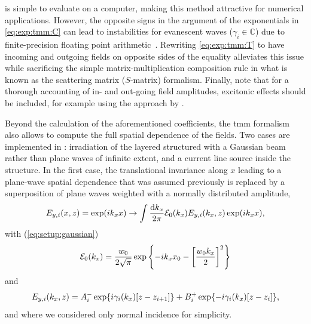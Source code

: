  is simple to evaluate on a computer, making this method attractive for numerical applications.
However, the opposite signs in the argument of the exponentials in \cref{eq:exp:tmm:C} can lead to instabilities for evanescent waves ($\gamma_i\in\mathbb{C}$) due to finite-precision floating point arithmetic~\cite{Duetz}.
Rewriting \cref{eq:exp:tmm:T} to have incoming and outgoing fields on opposite sides of the equality alleviates this issue while sacrificing the simple matrix-multiplication composition rule in what is known as the scattering matrix ($S$-matrix) formalism.
Finally, note that for a thorough accounting of in- and out-going field amplitudes, excitonic effects should be included, for example using the approach by \textcite{DAndrea1990}.

Beyond the calculation of the aforementioned coefficients, the \gls{tmm} formalism also allows to compute the full spatial dependence of the fields.
Two cases are implemented in \pymoosh: irradiation of the layered structured with a Gaussian beam rather than plane waves of infinite extent, and a current line source inside the structure.
In the first case, the translational invariance along $x$ leading to a plane-wave spatial dependence
that was assumed previously is replaced by a superposition of plane waves weighted with a normally distributed amplitude,
\begin{equation}\label{eq:exp:tmm:gauss:x}
    E_{y,i}(x,z) = \exp(i k_x x)\rightarrow \int\frac{\dd{k_x}}{2\pi}\mathcal{E}_0(k_x) E_{y,i}(k_x, z)\exp(i k_x x),
\end{equation}
with (\cf \cref{eq:setup:gaussian})
\begin{equation}\label{eq:exp:tmm:gauss:ampl}
    \mathcal{E}_0(k_x) = \frac{w_0}{2\sqrt{\pi}}\exp\left\lbrace - i k_x x_0 -\left[\frac{w_0 k_x}{2}\right]^2\right\rbrace
\end{equation}
and
\begin{equation}\label{eq:exp:tmm:gauss:z}
    E_{y,i}(k_x, z) = A_{i}^{-}\exp\lbrace i\gamma_i(k_x)[z-z_{i+1}]\rbrace + B_{i}^{+}\exp\lbrace -i\gamma_i(k_x)[z-z_{i}]\rbrace,
\end{equation}
and where we considered only normal incidence for simplicity.

